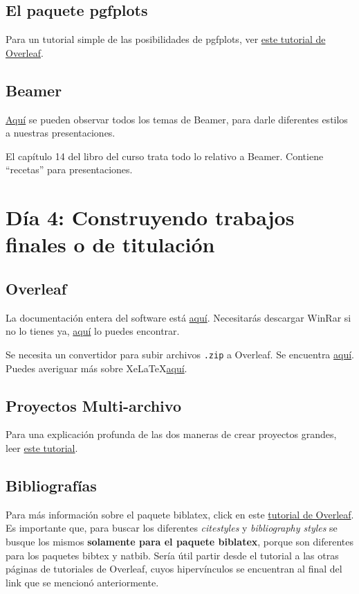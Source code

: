 \documentclass[a4paper]{article}
\begin{document}
\subsection{El paquete \textsf{pgfplots}}
Para un tutorial simple de las posibilidades de \textsf{pgfplots}, ver \href{https://www.overleaf.com/learn/latex/Pgfplots_package}{este tutorial de Overleaf}.
\subsection{Beamer}
\href{https://deic-web.uab.cat/~iblanes/beamer_gallery/index.html}{Aquí} se pueden observar todos los temas de Beamer, para darle diferentes estilos a nuestras presentaciones. 

El capítulo 14 del libro del curso trata todo lo relativo a Beamer. Contiene ``recetas'' para presentaciones. 
\section{Día 4: Construyendo trabajos finales o de titulación}
\subsection{Overleaf}
La documentación entera del software está \href{https://www.overleaf.com/learn}{aquí}. 
Necesitarás descargar WinRar si no lo tienes ya, \href{https://www.win-rar.com/start.html?&L=0}{aquí} lo puedes encontrar.

Se necesita un convertidor para subir archivos \texttt{.zip} a Overleaf. Se encuentra \href{https://cloudconvert.com/rar-to-zip}{aquí}. 
Puedes averiguar más sobre Xe\LaTeX \href{https://www.overleaf.com/learn/latex/XeLaTeX}{aquí}.
\subsection{Proyectos Multi-archivo}
Para una explicación profunda de las dos maneras de crear proyectos grandes, leer \href{https://www.overleaf.com/learn/latex/Multi-file_LaTeX_projects}{este tutorial}.
\subsection{Bibliografías}
Para más información sobre el paquete \textsf{biblatex}, click en este \href{https://www.overleaf.com/learn/latex/bibliography_management_with_biblatex}{tutorial de Overleaf}. Es importante que, para buscar los diferentes \textit{citestyles} y \textit{bibliography styles} se busque los mismos \textbf{solamente para el paquete \textsf{biblatex}}, porque son diferentes para los paquetes \textsf{bibtex} y \textsf{natbib}. Sería útil partir desde el tutorial a las otras páginas de tutoriales de Overleaf, cuyos hipervínculos se encuentran al final del link que se mencionó anteriormente. 
\end{document}

